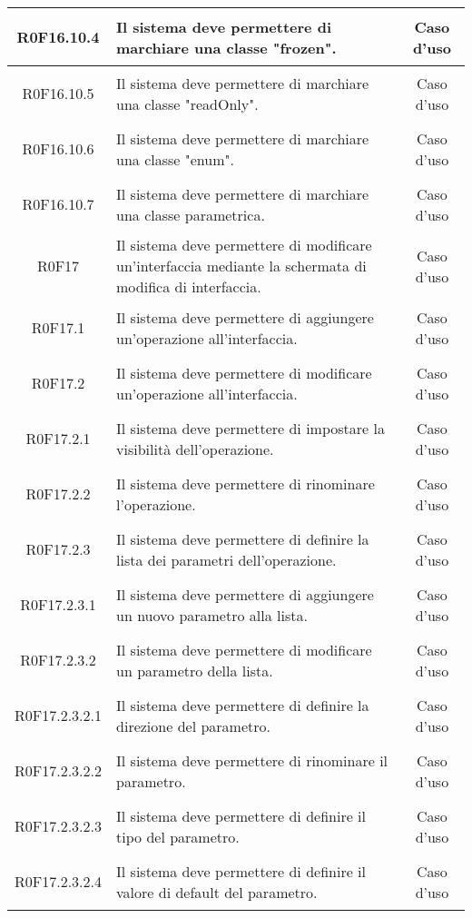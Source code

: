 \documentclass[../AnalisiDeiRequisiti.tex]{subfiles}
\begin{document}
\begin{longtable}{|c|>{\centering}p{7cm}|c|}
\hypertarget{R0F16.10.4}{R0F16.10.4} & Il sistema deve permettere di marchiare una classe "frozen". & Caso d'uso \\ \hline
\hypertarget{R0F16.10.5}{R0F16.10.5} & Il sistema deve permettere di marchiare una classe "readOnly". & Caso d'uso \\ \hline
\hypertarget{R0F16.10.6}{R0F16.10.6} & Il sistema deve permettere di marchiare una classe "enum". & Caso d'uso \\ \hline
\hypertarget{R0F16.10.7}{R0F16.10.7} & Il sistema deve permettere di marchiare una classe parametrica. & Caso d'uso \\ \hline
\hypertarget{R0F17}{R0F17} & Il sistema deve permettere di modificare un'interfaccia mediante la schermata di modifica di interfaccia. & Caso d'uso \\ \hline
\hypertarget{R0F17.1}{R0F17.1} & Il sistema deve permettere di aggiungere un'operazione all'interfaccia. & Caso d'uso \\ \hline
\hypertarget{R0F17.2}{R0F17.2} & Il sistema deve permettere di modificare un'operazione all'interfaccia. & Caso d'uso \\ \hline
\hypertarget{R0F17.2.1}{R0F17.2.1} & Il sistema deve permettere di impostare la visibilità dell'operazione. & Caso d'uso \\ \hline
\hypertarget{R0F17.2.2}{R0F17.2.2} & Il sistema deve permettere di rinominare l'operazione. & Caso d'uso \\ \hline
\hypertarget{R0F17.2.3}{R0F17.2.3} & Il sistema deve permettere di definire la lista dei parametri dell'operazione. & Caso d'uso \\ \hline
\hypertarget{R0F17.2.3.1}{R0F17.2.3.1} & Il sistema deve permettere di aggiungere un nuovo parametro alla lista. & Caso d'uso \\ \hline
\hypertarget{R0F17.2.3.2}{R0F17.2.3.2} & Il sistema deve permettere di modificare un parametro della lista. & Caso d'uso \\ \hline
\hypertarget{R0F17.2.3.2.1}{R0F17.2.3.2.1} & Il sistema deve permettere di definire la direzione del parametro. & Caso d'uso \\ \hline
\hypertarget{R0F17.2.3.2.2}{R0F17.2.3.2.2} & Il sistema deve permettere di rinominare il parametro. & Caso d'uso \\ \hline
\hypertarget{R0F17.2.3.2.3}{R0F17.2.3.2.3} & Il sistema deve permettere di definire il tipo del parametro. & Caso d'uso \\ \hline
\hypertarget{R0F17.2.3.2.4}{R0F17.2.3.2.4} & Il sistema deve permettere di definire il valore di default del parametro. & Caso d'uso \\ \hline

\end{longtable}
\end{document}
